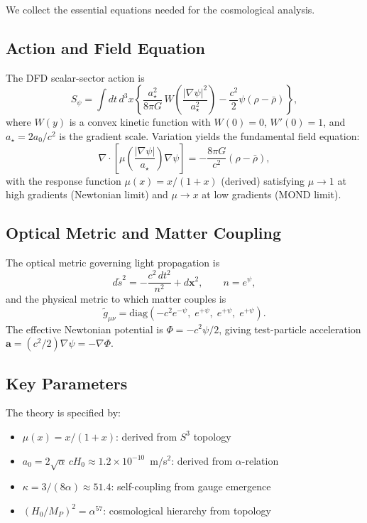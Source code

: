 \documentclass[aps,prd,twocolumn,superscriptaddress,nofootinbib]{revtex4-2}
\newcommand{\avec}{\bm{a}}
\begin{document}
We collect the essential equations needed for the cosmological analysis.

\subsection{Action and Field Equation}

The DFD scalar-sector action is
\begin{equation}\label{eq:action}
S_\psi = \int dt\,d^3x\left\{
  \frac{a_\star^2}{8\pi G}\,W\!\left(\frac{|\nabla\psi|^2}{a_\star^2}\right)
  - \frac{c^2}{2}\psi(\rho - \bar\rho)
\right\},
\end{equation}
where $W(y)$ is a convex kinetic function with $W(0)=0$, $W'(0)=1$, and
$a_\star = 2a_0/c^2$ is the gradient scale. Variation yields the
fundamental field equation:
\begin{equation}\label{eq:field-eq}
\nabla\cdot\left[\mu\!\left(\frac{|\nabla\psi|}{a_\star}\right)
\nabla\psi\right] = -\frac{8\pi G}{c^2}(\rho - \bar\rho),
\end{equation}
with the response function $\mu(x) = x/(1+x)$ (derived) satisfying
$\mu \to 1$ at high gradients (Newtonian limit) and $\mu \to x$ at
low gradients (MOND limit).

\subsection{Optical Metric and Matter Coupling}

The optical metric governing light propagation is
\begin{equation}\label{eq:optical-metric}
d\tilde{s}^2 = -\frac{c^2\,dt^2}{n^2} + d\mathbf{x}^2,
\qquad n = e^\psi,
\end{equation}
and the physical metric to which matter couples is
\begin{equation}\label{eq:physical-metric}
\tilde{g}_{\mu\nu} = \text{diag}(-c^2 e^{-\psi},\;e^{+\psi},\;e^{+\psi},\;e^{+\psi}).
\end{equation}
The effective Newtonian potential is $\Phi = -c^2\psi/2$, giving
test-particle acceleration $\avec = (c^2/2)\nabla\psi = -\nabla\Phi$.

\subsection{Key Parameters}

The theory is specified by:
\begin{itemize}[nosep]
\item $\mu(x) = x/(1+x)$: derived from $S^3$ topology
\item $a_0 = 2\sqrt{\alpha}\,cH_0 \approx 1.2\times 10^{-10}$~m/s$^2$:
  derived from $\alpha$-relation
\item $\kappa = 3/(8\alpha) \approx 51.4$: self-coupling from gauge emergence
\item $(H_0/M_P)^2 = \alpha^{57}$: cosmological hierarchy from topology
\end{itemize}
\end{document}
